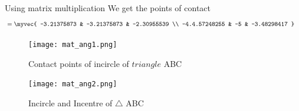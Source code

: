 \documentclass[11pt]{book}
\begin{document}
\begin{enumerate}[label=\thesubsection.\arabic*.,ref=\thesubsection.\theenumi]
Using matrix multiplication We get the points of contact 
\begin{align}
    &= \myvec{ -3.21375873 & -3.21375873 & -2.30955539 \\ -4.4.57248255 & -5 & -3.48298417 }
\end{align}
\begin{figure}[H]
    \centering
    \texttt{[image: mat\_ang1.png]}
    \caption{Contact points of incircle of $triangle$ ABC}
    \label{fig:mat_ang1}
\end{figure}
\begin{figure}[H]
    \centering
    \texttt{[image: mat\_ang2.png]}
    \caption{Incircle and Incentre of $\triangle$ ABC }
    \label{fig:mat_ang2}
\end{figure}
\end{enumerate}
\end{document}
